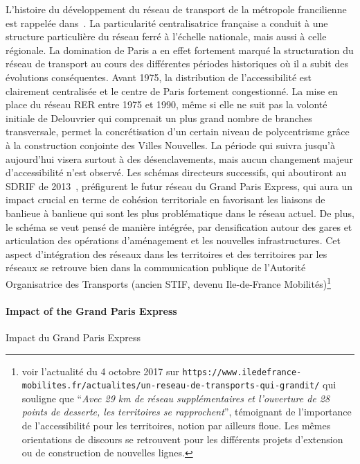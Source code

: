 L'histoire du développement du réseau de transport de la métropole francilienne est rappelée dans~\cite{beauguitte:halshs-01068589}. La particularité centralisatrice française a conduit à une structure particulière du réseau ferré à l'échelle nationale, mais aussi à celle régionale. La domination de Paris a en effet fortement marqué la structuration du réseau de transport au cours des différentes périodes historiques où il a subit des évolutions conséquentes. Avant 1975, la distribution de l'accessibilité est clairement centralisée et le centre de Paris fortement congestionné. La mise en place du réseau RER entre 1975 et 1990, même si elle ne suit pas la volonté initiale de Delouvrier qui comprenait un plus grand nombre de branches transversale, permet la concrétisation d'un certain niveau de polycentrisme grâce à la construction conjointe des Villes Nouvelles. La période qui suivra jusqu'à aujourd'hui visera surtout à des désenclavements, mais aucun changement majeur d'accessibilité n'est observé. Les schémas directeurs successifs, qui aboutiront au SDRIF de 2013~\cite{sdrif2013}, préfigurent le futur réseau du Grand Paris Express, qui aura un impact crucial en terme de cohésion territoriale en favorisant les liaisons de banlieue à banlieue qui sont les plus problématique dans le réseau actuel. De plus, le schéma se veut pensé de manière intégrée, par densification autour des gares et articulation des opérations d'aménagement et les nouvelles infrastructures. Cet aspect d'intégration des réseaux dans les territoires et des territoires par les réseaux se retrouve bien dans la communication publique de l'Autorité Organisatrice des Transports (ancien STIF, devenu Ile-de-France Mobilités)\footnote{voir l'actualité du 4 octobre 2017 sur \texttt{https://www.iledefrance-mobilites.fr/actualites/un-reseau-de-transports-qui-grandit/} qui souligne que ``\textit{Avec 29 km de réseau supplémentaires et l’ouverture de 28 points de desserte, les territoires se rapprochent}'', témoignant de l'importance de l'accessibilité pour les territoires, notion par ailleurs floue. Les mêmes orientations de discours se retrouvent pour les différents projets d'extension ou de construction de nouvelles lignes.}




\paragraph{Impact of the Grand Paris Express}{Impact du Grand Paris Express}


